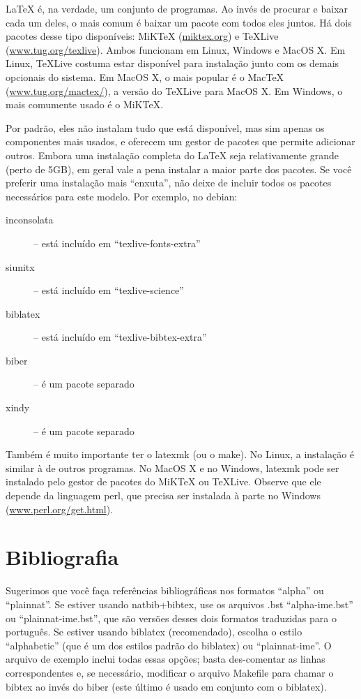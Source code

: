 \LaTeX{} é, na verdade, um conjunto de programas. Ao invés de procurar e
baixar cada um deles, o mais comum é baixar um pacote com todos eles juntos.
Há dois pacotes desse tipo disponíveis: MiK\TeX{} (\url{miktex.org}) e
\TeX{}Live (\url{www.tug.org/texlive}). Ambos funcionam em Linux, Windows e
MacOS X. Em Linux, \TeX{}Live costuma estar disponível para instalação junto
com os demais opcionais do sistema. Em MacOS X, o mais popular é o Mac\TeX{}
(\url{www.tug.org/mactex/}), a versão do \TeX{}Live para MacOS X.  Em Windows,
o mais comumente usado é o MiK\TeX{}.

Por padrão, eles não instalam tudo que está disponível, mas sim apenas os
componentes mais usados, e oferecem um gestor de pacotes que permite adicionar
outros. Embora uma instalação completa do \LaTeX{} seja relativamente grande
(perto de 5GB), em geral vale a pena instalar a maior parte dos pacotes. Se
você preferir uma instalação mais ``enxuta'', não deixe de incluir todos os
pacotes necessários para este modelo. Por exemplo, no debian:

\begin{description}
  \item [inconsolata] -- está incluído em ``texlive-fonts-extra''
  \item [siunitx] -- está incluído em ``texlive-science''
  \item [biblatex] -- está incluído em ``texlive-bibtex-extra''
  \item [biber] -- é um pacote separado
  \item [xindy] -- é um pacote separado
\end{description}

Também é muito importante ter o \textsf{latexmk} (ou o \textsf{make}). No Linux,
a instalação é similar à de outros programas. No MacOS X e no Windows,
\textsf{latexmk} pode ser instalado pelo gestor de pacotes do MiK\TeX{} ou
\TeX{}Live. Observe que ele depende da linguagem \textsf{perl}, que precisa ser
instalada à parte no Windows (\url{www.perl.org/get.html}).

\section{Bibliografia}

Sugerimos que você faça referências bibliográficas nos formatos ``alpha'' ou
``plainnat''.  Se estiver usando natbib+bibtex,
use os arquivos .bst ``alpha-ime.bst'' ou ``plainnat-ime.bst'', que são
versões desses dois formatos traduzidas para o português. Se estiver usando
biblatex (recomendado), escolha o estilo ``alphabetic''
(que é um dos estilos padrão do biblatex) ou ``plainnat-ime''. O arquivo de
exemplo inclui todas essas opções; basta des-comentar as linhas
correspondentes e, se necessário, modificar o arquivo Makefile para chamar
o bibtex ao invés do biber (este último é usado
em conjunto com o biblatex).

